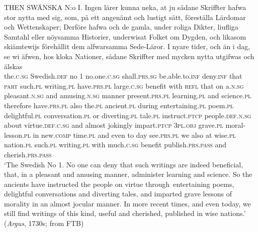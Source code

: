 \documentclass[output=paper]{langscibook}
\begin{document}
\ea        \label{ex:intro:3}
\gll  THEN   SWÄNSKA        N:o I.     Ingen         lärer  kunna         neka,     at     ju       sådane   Skriffter hafwa         stor       nytta     med   sig,   som,   på   ett     angenämt   och lustigt         sätt,     föreställa       Lärdomar   och Wettenskaper;   Derföre hafwa         och de     gamla,     under   roliga         Dikter, liufliga       Samtahl         eller   nöysamma   Historier, underwisat Folket           om   Dygden,        och   likasom   skiämtewijs   förehållit dem       alfwarsamma   Sede-Läror.      I  nyare       tider,    och   än     i   dag, se             wi   äfwen, hos kloka     Nationer,   sådane   Skriffter med   mycken     nytta       utgifwas         och   älskas\\
  the.\textsc{c.sg}   Swedish\textsc{.def}    no 1  no.one.\textsc{c.sg}   shall\textsc{.prs.sg} be.able.to.\textsc{inf}  deny.\textsc{inf}   that   \textsc{part}  such.\textsc{pl}  writing.\textsc{pl}  have.\textsc{prs.pl}   large.\textsc{c.sg}  benefit  with  \textsc{refl}  that  on    a.\textsc{n.sg}  pleasant.\textsc{n.sg}  and amusing.\textsc{n.sg}   manner  present.\textsc{prs.pl}    learning.\textsc{pl}  and science.\textsc{pl}    therefore have.\textsc{prs.pl}   also the.\textsc{pl}  ancient\textsc{.pl}  during  entertaining.\textsc{pl}  poem.\textsc{pl} delightful.\textsc{pl}  conversation.\textsc{pl}   or    diverting.\textsc{pl}  tale.\textsc{pl}  instruct.\textsc{ptcp} people.\textsc{def.n.sg}  about  virtue.\textsc{def.c.sg}  and  almost  jokingly    impart.\textsc{ptcp} \textsc{3pl.obj}  grave.\textsc{pl}      moral-lesson\textsc{.pl}  in   new.\textsc{comp}  time.\textsc{pl}  and  even to   day see.\textsc{prs.pl}   we   also     at  wise.\textsc{pl}  nation.\textsc{pl}  such.\textsc{pl}   writing.\textsc{pl} with   much\textsc{.c.sg}   benefit   publish.\textsc{prs.pass}   and  cherish.\textsc{prs.pass}\\
\glt ‘The Swedish  No 1. No one can deny that such writings are indeed beneficial, that, in a pleasant and amusing manner, administer learning and science. So the ancients have instructed the people on virtue through~entertaining poems, delightful conversations and diverting tales, and imparted grave lessons of morality in an almost jocular manner. In more recent times, and even today, we still find writings of this kind, useful and cherished, published in wise nations.’ (\textit{Argus}, 1730s; from FTB)
\z
\end{document}
